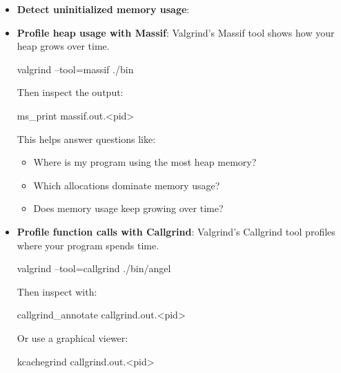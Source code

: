 \documentclass{report}
\begin{document}
\begin{itemize}
\begin{itemize}
                    \item \textbf{Detect uninitialized memory usage}: 
                    \item \textbf{Profile heap usage with Massif}: Valgrind’s Massif tool shows how your heap grows over time.
                        \bigbreak \noindent 
                        \begin{bashcode}
                           valgrind --tool=massif ./bin
                        \end{bashcode}
                        \bigbreak \noindent 
                        Then inspect the output:
                        \bigbreak \noindent 
                        \begin{bashcode}
                        ms_print massif.out.<pid>
                        \end{bashcode}
                        \bigbreak \noindent 
                        This helps answer questions like:
                        \begin{itemize}
                            \item Where is my program using the most heap memory?
                            \item Which allocations dominate memory usage?
                            \item Does memory usage keep growing over time?
                        \end{itemize}
                    \item \textbf{Profile function calls with Callgrind}: Valgrind’s Callgrind tool profiles where your program spends time.
                        \bigbreak \noindent 
                        \begin{bashcode}
                        valgrind --tool=callgrind ./bin/angel
                        \end{bashcode}
                        \bigbreak \noindent 
                        Then inspect with:
                        \bigbreak \noindent 
                        \begin{bashcode}
                        callgrind_annotate callgrind.out.<pid>
                        \end{bashcode}
                        \bigbreak \noindent 
                        Or use a graphical viewer:
                        \bigbreak \noindent 
                        \begin{bashcode}
                        kcachegrind callgrind.out.<pid>
                        \end{bashcode}

\end{itemize}
\end{itemize}
\end{document}
